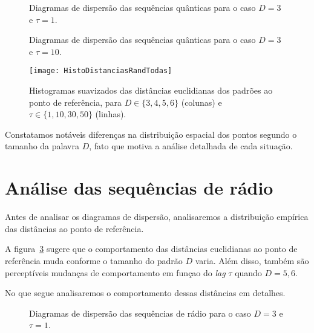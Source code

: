 \begin{figure}
\centering
{}
\caption{Diagramas de dispersão das sequências quânticas para o caso $D=3$ e $\tau=1$.}\label{Fig:QuantD3tau1}
\end{figure}

\begin{figure}
\centering
{}
\caption{Diagramas de dispersão das sequências quânticas para o caso $D=3$ e $\tau=10$.}\label{Fig:QuantD3tau10log}
\end{figure}

\begin{figure}[hbt]
	\centering
	\texttt{[image: HistoDistanciasRandTodas]}
	\caption{Histogramas suavizados das distâncias euclidianas dos padrões ao ponto de referência, para $D\in\{3,4,5,6\}$ (colunas) e $\tau\in\{1,10,30,50\}$ (linhas).}\label{Fig:HistoDistanciasRandTodas}
\end{figure}



Constatamos notáveis diferenças na distribuição espacial dos pontos segundo o tamanho da palavra $D$, fato que motiva a análise detalhada de cada situação.

\section{Análise das sequências de rádio}


Antes de analisar os diagramas de dispersão, analisaremos a distribuição empírica das distâncias ao ponto de referência.

A figura~\ref{Fig:HistoDistanciasRandTodas} sugere que o comportamento das distâncias euclidianas ao ponto de referência muda conforme o tamanho do padrão $D$ varia.
Além disso, também são perceptíveis mudanças de comportamento em funçao do \textit{lag} $\tau$ quando $D=5,6$.

No que segue analisaremos o comportamento dessas distâncias em detalhes.


\begin{figure}
	\centering
	\caption{Diagramas de dispersão das sequências de rádio para o caso $D=3$ e $\tau=1$.}\label{Fig:RadioD3tau1}
\end{figure}

